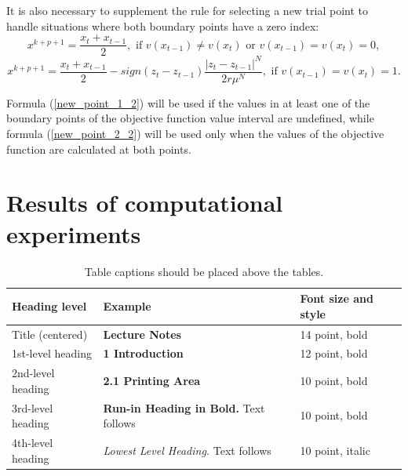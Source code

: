 \documentclass[runningheads]{llncs}
\begin{document}
It is also necessary to supplement the rule for selecting a new trial point to handle situations where both boundary points have a zero index:
\begin{equation}\label{new_point_1_2} 
x^{k+p+1} = \frac{x_t+x_{t-1}}{2}, \text{ if } v(x_{t-1}) \neq v(x_t) \text{ or } v(x_{t-1})=v(x_t)=0,
\end{equation}
\begin{equation}\label{new_point_2_2} 
x^{k+p+1} = \frac{x_t+x_{t-1}}{2}-\textit{sign}{(z_t-z_{t-1})}\frac{|z_t-z_{t-1}|^N}{2r\mu^N}, \text{ if } v(x_{t-1})=v(x_t) = 1.
\end{equation}

Formula (\ref{new_point_1_2}) will be used if the values in at least one of the boundary points of the objective function value interval are undefined, while formula (\ref{new_point_2_2}) will be used only when the values of the objective function are calculated at both points.

\section{Results of computational experiments}\label{sec:RCE}



\begin{table}
\caption{Table captions should be placed above the tables.}\label{tab1}
\begin{tabular}{|l|l|l|}
\hline
Heading level &  Example & Font size and style\\
\hline
Title (centered) &  {\Large\bfseries Lecture Notes} & 14 point, bold\\
1st-level heading &  {\large\bfseries 1 Introduction} & 12 point, bold\\
2nd-level heading & {\bfseries 2.1 Printing Area} & 10 point, bold\\
3rd-level heading & {\bfseries Run-in Heading in Bold.} Text follows & 10 point, bold\\
4th-level heading & {\itshape Lowest Level Heading.} Text follows & 10 point, italic\\
\hline
\end{tabular}
\end{table}
\end{document}
